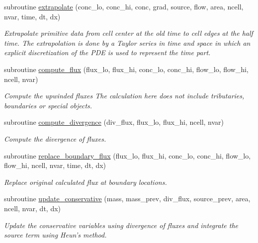 \begin{CompactItemize}
subroutine \hyperlink{a00049_36ba824cb5dc6ca6127866376d2e79ec}{extrapolate} (conc\_\-lo, conc\_\-hi, conc, grad, source, flow, area, ncell, nvar, time, dt, dx)
\begin{CompactList}\small\item\em Extrapolate primitive data from cell center at the old time to cell edges at the half time. The extrapolation is done by a Taylor series in time and space in which an explicit discretization of the PDE is used to represent the time part. \item\end{CompactList}\item 
subroutine \hyperlink{a00049_3947a8a29b1c666b2d1b7223215e9873}{compute\_\-flux} (flux\_\-lo, flux\_\-hi, conc\_\-lo, conc\_\-hi, flow\_\-lo, flow\_\-hi, ncell, nvar)
\begin{CompactList}\small\item\em Compute the upwinded fluxes The calculation here does not include tributaries, boundaries or special objects. \item\end{CompactList}\item 
subroutine \hyperlink{a00049_aa34a3af6ce02dba4b6a11c1b38f51f0}{compute\_\-divergence} (div\_\-flux, flux\_\-lo, flux\_\-hi, ncell, nvar)
\begin{CompactList}\small\item\em Compute the divergence of fluxes. \item\end{CompactList}\item 
subroutine \hyperlink{a00049_ce0b27ec0ac171c15a919d07fb3b32c3}{replace\_\-boundary\_\-flux} (flux\_\-lo, flux\_\-hi, conc\_\-lo, conc\_\-hi, flow\_\-lo, flow\_\-hi, ncell, nvar, time, dt, dx)
\begin{CompactList}\small\item\em Replace original calculated flux at boundary locations. \item\end{CompactList}\item 
subroutine \hyperlink{a00049_3785ecc18bdbada28d0be139c7839690}{update\_\-conservative} (mass, mass\_\-prev, div\_\-flux, source\_\-prev, area, ncell, nvar, dt, dx)
\begin{CompactList}\small\item\em Update the conservative variables using divergence of fluxes and integrate the source term using Heun's method. \item\end{CompactList}\end{CompactItemize}


